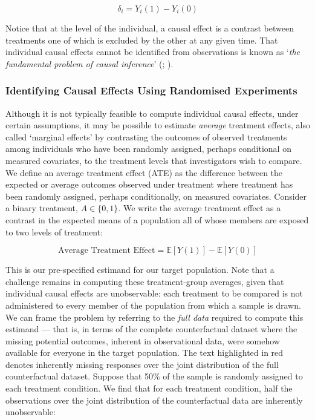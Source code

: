 \documentclass[
  single column]{article}
\begin{document}
\[
\delta_i = Y_i(1) - Y_i(0)
\]

Notice that at the level of the individual, a causal effect is a
contrast between treatments one of which is excluded by the other at any
given time. That individual causal effects cannot be identified from
observations is known as `\emph{the fundamental problem of causal
inference}' (;
).

\subsubsection{Identifying Causal Effects Using Randomised
Experiments}\label{identifying-causal-effects-using-randomised-experiments}

Although it is not typically feasible to compute individual causal
effects, under certain assumptions, it may be possible to estimate
\emph{average} treatment effects, also called `marginal effects' by
contrasting the outcomes of observed treatments among individuals who
have been randomly assigned, perhaps conditional on measured covariates,
to the treatment levels that investigators wish to compare. We define an
average treatment effect (ATE) as the difference between the expected or
average outcomes observed under treatment where treatment has been
randomly assigned, perhaps conditionally, on measured covariates.
Consider a binary treatment, \(A \in \{0,1\}\). We write the average
treatment effect as a contrast in the expected means of a population all
of whose members are exposed to two levels of treatment:

\[
\text{Average Treatment Effect} = \mathbb{E}[Y(1)] - \mathbb{E}[Y(0)]
\]

This is our pre-specified estimand for our target population. Note that
a challenge remains in computing these treatment-group averages, given
that individual causal effects are unobservable: each treatment to be
compared is not administered to every member of the population from
which a sample is drawn. We can frame the problem by referring to the
\emph{full data} required to compute this estimand --- that is, in terms
of the complete counterfactual dataset where the missing potential
outcomes, inherent in observational data, were somehow available for
everyone in the target population. The text highlighted in red denotes
inherently missing responses over the joint distribution of the full
counterfactual dataset. Suppose that 50\% of the sample is randomly
assigned to each treatment condition. We find that for each treatment
condition, half the observations over the joint distribution of the
counterfactual data are inherently unobservable:
\end{document}
